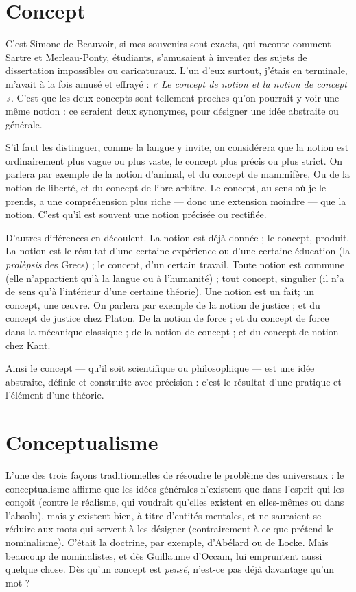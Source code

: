 \section{Concept}
C'est Simone de Beauvoir, si mes souvenirs sont exacts, qui
raconte comment Sartre et Merleau-Ponty, étudiants, s’amusaient
à inventer des sujets de dissertation impossibles ou caricaturaux. L'un
d'eux surtout, j'étais en terminale, m'avait à la fois amusé et effrayé : {\it « Le
concept de notion et la notion de concept »}. C’est que les deux concepts sont tellement
proches qu’on pourrait y voir une même notion : ce seraient deux synonymes,
pour désigner une idée abstraite ou générale.

S’il faut les distinguer, comme la langue y invite, on considérera que la
notion est ordinairement plus vague ou plus vaste, le concept plus précis ou
plus strict. On parlera par exemple de la notion d’animal, et du concept de
mammifère, Ou de la notion de liberté, et du concept de libre arbitre. Le
concept, au sens où je le prends, a une compréhension plus riche — donc une
extension moindre — que la notion. C’est qu’il est souvent une notion précisée
ou rectifiée.

D’autres différences en découlent. La notion est déjà donnée ; le concept,
produit. La notion est le résultat d’une certaine expérience ou d’une certaine
éducation (la {\it prolèpsis} des Grecs) ; le concept, d’un certain travail. Toute
notion est commune (elle n'appartient qu’à la langue ou à l'humanité) ; tout
concept, singulier (il n’a de sens qu’à l’intérieur d’une certaine théorie). Une
notion est un fait; un concept, une œuvre. On parlera par exemple de la
notion de justice ; et du concept de justice chez Platon. De la notion de force ;
et du concept de force dans la mécanique classique ; de la notion de concept ;
et du concept de notion chez Kant.

Ainsi le concept — qu’il soit scientifique ou philosophique — est une idée
abstraite, définie et construite avec précision : c’est le résultat d’une pratique et
l'élément d’une théorie.

\section{Conceptualisme}
L’une des trois façons traditionnelles de résoudre le
problème des universaux : le conceptualisme affirme
que les idées générales n'existent que dans l’esprit qui les conçoit (contre le réalisme,
qui voudrait qu’elles existent en elles-mêmes ou dans l'absolu), mais y
existent bien, à titre d’entités mentales, et ne sauraient se réduire aux mots qui
servent à les désigner (contrairement à ce que prétend le nominalisme). C'était
la doctrine, par exemple, d’Abélard ou de Locke. Mais beaucoup de nominalistes,
et dès Guillaume d’Occam, lui empruntent aussi quelque chose. Dès
qu’un concept est {\it pensé}, n’est-ce pas déjà davantage qu’un mot ?


